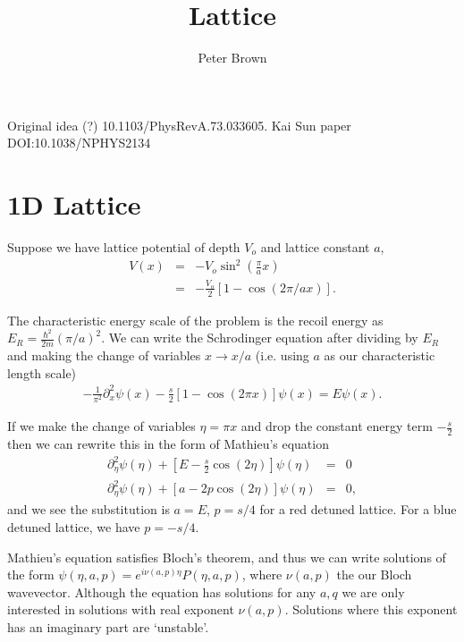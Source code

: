 \documentclass{article}
\author{Peter Brown}
\title{Lattice}
\theoremstyle{definition}
\begin{document}
\maketitle

Original idea (?) 10.1103/PhysRevA.73.033605.
Kai Sun paper DOI:10.1038/NPHYS2134

\section{1D Lattice}
Suppose we have lattice potential of depth $V_o$ and lattice constant $a$,
\begin{eqnarray}
V(x) &=& -V_o \sin^2 \left( \frac{\pi}{a} x \right)\\
&=& -\frac{V_o}{2} \left[ 1 - \cos(2\pi/a x) \right].
\end{eqnarray} 

The characteristic energy scale of the problem is the recoil energy as $E_R = \frac{\hbar^2}{2m} (\pi/a)^2$. We can write the Schrodinger equation after dividing by $E_R$ and making the change of variables $x \to x/a$ (i.e. using $a$ as our characteristic length scale)
\begin{eqnarray}
-\frac{1}{\pi^2} \partial_x^2 \psi(x) - \frac{s}{2} \left[1 - \cos(2\pi x) \right] \psi(x) = E \psi(x).
\end{eqnarray}

If we make the change of variables $\eta = \pi x$ and drop the constant energy term $-\frac{s}{2}$ then we can rewrite this in the form of Mathieu's equation
\begin{eqnarray}
\partial_\eta^2 \psi(\eta) + \left[E - \frac{s}{2} \cos(2 \eta) \right] \psi(\eta) &=& 0\\
\partial_\eta^2 \psi(\eta) + \left[a - 2 p \cos(2\eta) \right] \psi(\eta) &=& 0,
\end{eqnarray}
and we see the substitution is $a = E$, $p = s/4$ for a red detuned lattice. For a blue detuned lattice, we have $p = -s/4$.

Mathieu's equation satisfies Bloch's theorem, and thus we can write solutions of the form $\psi(\eta, a, p) = e^{i \nu(a, p) \eta} P(\eta, a, p)$, where $\nu(a,p)$ the our Bloch wavevector. Although the equation has solutions for any $a, q$ we are only interested in solutions with real exponent $\nu(a,p)$. Solutions where this exponent has an imaginary part are `unstable'.
\end{document}
